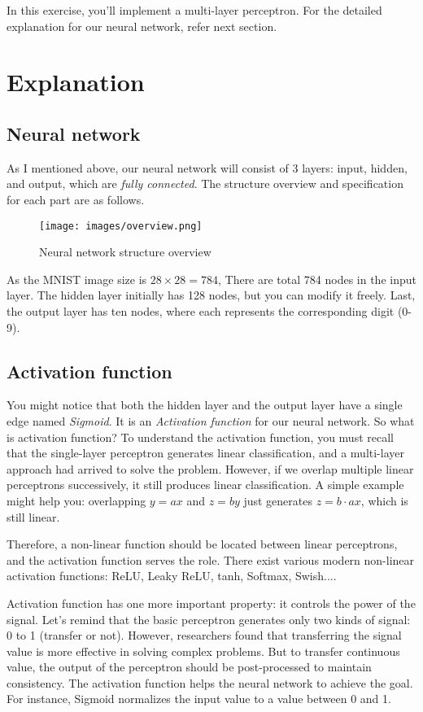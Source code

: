 \documentclass{oblivoir}
\begin{document}
In this exercise, you'll implement a multi-layer perceptron. For the detailed explanation for our neural network, refer next section.

\section{Explanation}

\subsection{Neural network}

As I mentioned above, our neural network will consist of 3 layers: input, hidden, and output, which are \textit{fully connected}. The structure overview and specification for each part are as follows.

\begin{figure}[h]
    \centering
    \texttt{[image: images/overview.png]}
    {\caption*{Neural network structure overview}}
\end{figure}

As the MNIST image size is $28 \times 28 = 784$, There are total 784 nodes in the input layer. The hidden layer initially has 128 nodes, but you can modify it freely. Last, the output layer has ten nodes, where each represents the corresponding digit (0-9). 

\subsection{Activation function}

You might notice that both the hidden layer and the output layer have a single edge named \textit{Sigmoid}. It is an \textit{Activation function} for our neural network. So what is activation function? To understand the activation function, you must recall that the single-layer perceptron generates linear classification, and a multi-layer approach had arrived to solve the problem. However, if we overlap multiple linear perceptrons successively, it still produces linear classification. A simple example might help you: overlapping $y=ax$ and $z=by$ just generates $z = b \cdot ax$, which is still linear.

Therefore, a non-linear function should be located between linear perceptrons, and the activation function serves the role. There exist various modern non-linear activation functions: ReLU, Leaky ReLU, tanh, Softmax, Swish.... 

Activation function has one more important property: it controls the power of the signal. Let's remind that the basic perceptron generates only two kinds of signal: 0 to 1 (transfer or not). However, researchers found that transferring the signal value is more effective in solving complex problems. But to transfer continuous value, the output of the perceptron should be post-processed to maintain consistency. The activation function helps the neural network to achieve the goal. For instance, Sigmoid normalizes the input value to a value between 0 and 1. 
\end{document}

